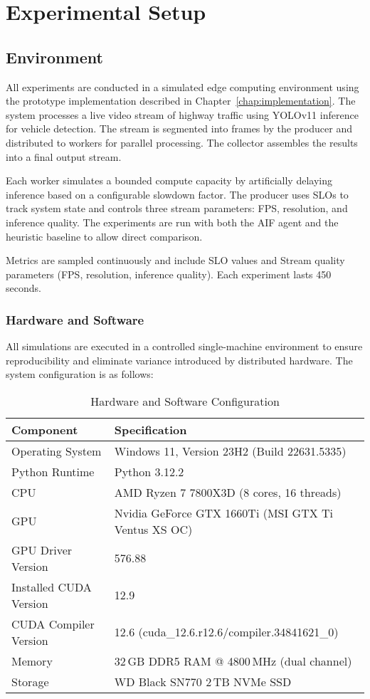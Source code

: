 \section{Experimental Setup}
\label{sec:evaluation-setup}

\subsection{Environment}
\label{sec:evaluation-environment}

All experiments are conducted in a simulated edge computing environment using the prototype implementation described in Chapter~\ref{chap:implementation}. The system processes a live video stream of highway traffic using YOLOv11 inference for vehicle detection. The stream is segmented into frames by the producer and distributed to workers for parallel processing. The collector assembles the results into a final output stream.

Each worker simulates a bounded compute capacity by artificially delaying inference based on a configurable slowdown factor. The producer uses SLOs to track system state and controls three stream parameters: FPS, resolution, and inference quality. The experiments are run with both the AIF agent and the heuristic baseline to allow direct comparison.

Metrics are sampled continuously and include SLO values and Stream quality parameters (FPS, resolution, inference quality). Each experiment lasts 450 seconds.

\subsubsection{Hardware and Software}
All simulations are executed in a controlled single-machine environment to ensure reproducibility and eliminate variance introduced by distributed hardware. The system configuration is as follows:

\begin{table}[H]
\centering
\caption{Hardware and Software Configuration}
\label{tab:hardware-software}
\begin{tabular}{@{}ll@{}}
\toprule
\textbf{Component} & \textbf{Specification} \\
\midrule
Operating System & Windows 11, Version 23H2 (Build 22631.5335) \\
Python Runtime & Python 3.12.2 \\
CPU & AMD Ryzen 7 7800X3D (8 cores, 16 threads) \\
GPU & Nvidia GeForce GTX 1660Ti (MSI GTX Ti Ventus XS OC) \\
GPU Driver Version & 576.88 \\
Installed CUDA Version & 12.9 \\
CUDA Compiler Version & 12.6 (cuda\_12.6.r12.6/compiler.34841621\_0) \\
Memory & 32\,GB DDR5 RAM @ 4800\,MHz (dual channel) \\
Storage & WD Black SN770 2\,TB NVMe SSD \\
\bottomrule
\end{tabular}
\end{table}


